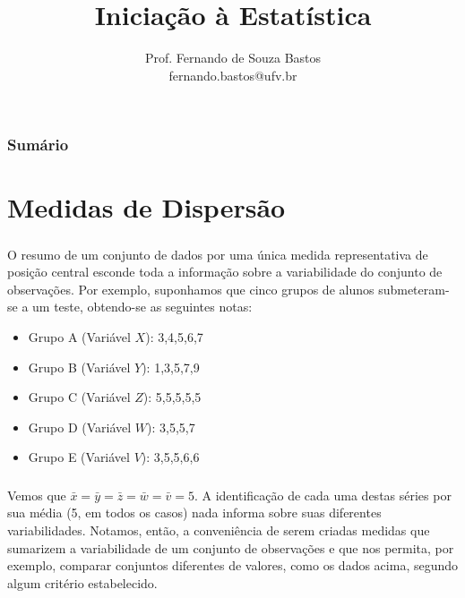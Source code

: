 \documentclass[14pt,aspectratio=1610]{beamer}
\title{Iniciação à Estatística}
\author{Prof. Fernando de Souza Bastos \texorpdfstring{\\ fernando.bastos@ufv.br}{}}
\institute{Departamento de Estatística \texorpdfstring{\\ Universidade Federal de Viçosa}{}\texorpdfstring{\\ Campus UFV - Viçosa}{}}
\date{}
\begin{document}
%

\frame{\titlepage}

\begin{frame}{}
\frametitle{\bf Sumário}
\tableofcontents
\end{frame}

\section{Medidas de Dispersão}
\begin{frame}{}
\frametitle{}
\begin{block}{}
\justifying
O resumo de um conjunto de dados por uma única medida representativa de posição
central esconde toda a informação sobre a variabilidade do conjunto de observações.
Por exemplo, suponhamos que cinco grupos de alunos submeteram-se a um
teste, obtendo-se as seguintes notas:
\begin{itemize}
\item Grupo A (Variável $X$): 3,4,5,6,7
\item Grupo B (Variável $Y$): 1,3,5,7,9
\item Grupo C (Variável $Z$): 5,5,5,5,5
\item Grupo D (Variável $W$): 3,5,5,7
\item Grupo E (Variável $V$): 3,5,5,6,6
\end{itemize}
\end{block}
\end{frame}

\begin{frame}{}
\frametitle{}
\begin{block}{}
\justifying
Vemos que $\bar{x}=\bar{y}=\bar{z}=\bar{w}=\bar{v}=5$. A identificação de cada uma destas séries por sua
média (5, em todos os casos) nada informa sobre suas diferentes variabilidades. Notamos, então, a conveniência de serem criadas medidas que sumarizem a variabilidade de um conjunto de observações e que nos permita, por exemplo, comparar conjuntos diferentes de valores, como os dados acima, segundo algum critério estabelecido.
\end{block}
\end{frame}

\end{document}
